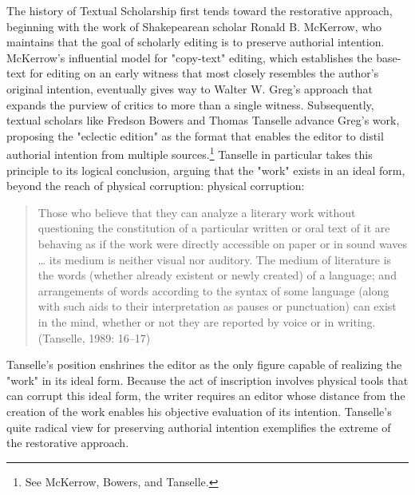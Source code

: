 \documentclass[11pt]{article}
\begin{document}
The history of Textual Scholarship first tends toward the restorative
approach, beginning with the work of Shakepearean scholar Ronald
B. McKerrow, who maintains that the goal of scholarly editing is to
preserve authorial intention. McKerrow's influential model for
"copy-text" editing, which establishes the base-text for editing on an
early witness that most closely resembles the author's original
intention, eventually gives way to Walter W. Greg's approach that
expands the purview of critics to more than a single
witness. Subsequently, textual scholars like Fredson Bowers and Thomas
Tanselle advance Greg's work, proposing the "eclectic edition" as the
format that enables the editor to distil authorial intention from
multiple sources.\footnote{See McKerrow, Bowers, and Tanselle.} Tanselle in particular takes this principle to
its logical conclusion, arguing that the "work" exists in an ideal
form, beyond the reach of physical corruption:
physical corruption: 
\begin{quote}
Those who believe that they can analyze a literary work without
questioning the constitution of a particular written or oral text of it
are behaving as if the work were directly accessible on paper or in
sound waves \ldots{} its medium is neither visual nor auditory. The medium of
literature is the words (whether already existent or newly created) of a
language; and arrangements of words according to the syntax of some
language (along with such aids to their interpretation as pauses or
punctuation) can exist in the mind, whether or not they are reported by
voice or in writing. (Tanselle, 1989: 16--17)
\end{quote}
Tanselle's position enshrines the editor as the only figure capable of
realizing the "work" in its ideal form. Because the act of inscription
involves physical tools that can corrupt this ideal form, the writer
requires an editor whose distance from the creation of the work
enables his objective evaluation of its intention. Tanselle's quite
radical view for preserving authorial intention exemplifies the
extreme of the restorative approach.
\end{document}
